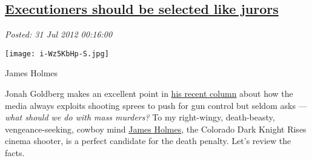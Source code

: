 %


\subsection*{\href{http://bakerjd99.wordpress.com/2012/07/30/executioners-should-be-selected-like-jurors/}{Executioners should be selected like jurors}}


\noindent\emph{Posted: 31 Jul 2012 00:16:00}
\vspace{6pt}



\captionsetup[floatingfigure]{labelformat=empty}
\begin{floatingfigure}[r]{0.18\textwidth}
\centering
\texttt{[image: i-Wz5KbHp-S.jpg]}
\caption{James Holmes}
\label{fig:3089X0}
\end{floatingfigure}Jonah Goldberg makes an excellent point in
\href{http://www.baltimoresun.com/news/opinion/oped/bs-ed-goldberg-death-penalty-20120730,0,6792851.story}{his
recent column} about how the media always exploits shooting sprees to
push for gun control but seldom asks --- \emph{what should we do with
mass murders?} To my right-wingy, death-beasty, vengeance-seeking,
cowboy mind
\href{http://www.washingtonpost.com/national/james-holmes-expected-to-be-charged-monday-in-colorado-massacre/2012/07/30/gJQAFCRQKX\_story.html}{James
Holmes}, the Colorado Dark Knight Rises cinema shooter, is a perfect
candidate for the death penalty. Let's review the facts.
\captionsetup[floatingfigure]{labelformat=empty}

